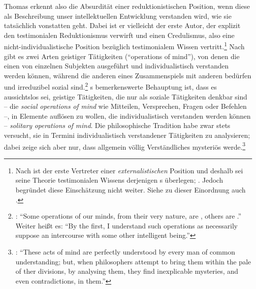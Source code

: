 Thomas  erkennt also die Absurdität einer reduktionistischen
Position, wenn diese als Beschreibung unser intellektuellen Entwicklung
verstanden wird, wie sie tatsächlich vonstatten geht. Dabei
ist er vielleicht der erste Autor, der explizit den testimonialen Reduktionismus
verwirft und einen Credulismus, also eine nicht-individualistische Position
bezüglich testimonialem Wissen vertritt.\footnote{Nach
 ist  der erste Vertreter einer
\emph{externalistischen} Position und deshalb sei seine Theorie testimonialen Wissens derjenigen s
überlegen;
\cite[vgl.][537]{Grundmann:AnalytischeEinfuehrungindieErkenntnistheorie2008}.
Jedoch begründet
 diese
Einschätzung nicht weiter. Siehe zu dieser Einordnung auch
\cite{Woudenberg:ThomasReidbetweenExternalismandInternalism2013}.} Nach
 gibt es zwei Arten
geistiger Tätigkeiten (\enquote{operations of mind}), von denen die einen von
einzelnen Subjekten ausgeführt und individualistisch verstanden werden können,
während die anderen eines Zusammenspiels mit anderen bedürfen und irreduzibel
sozial
sind.\footnote{\cite[Vgl.][68]{Reid:EssaysontheIntellectualPowersofMan2002}:
\enquote{Some operations of our minds, from their very nature, are ,
others are .} Weiter heißt es: \enquote{By the first, I understand
such operations as necessarily suppose an intercourse with some other
intelligent being.}} s
bemerkenswerte Behauptung ist, dass es aussichtslos sei, geistige Tätigkeiten,
die nur als soziale Tätigkeiten denkbar sind -- die \emph{social operations of
mind} wie Mitteilen, Versprechen, Fragen oder Befehlen --, in Elemente auflösen
zu wollen, die individualistisch verstanden werden können -- \emph{solitary
operations of mind}. Die
philosophische Tradition habe zwar stets versucht, sie in Termini
individualistisch verstandener Tätigkeiten zu analysieren; dabei zeige sich aber
nur, dass allgemein völlig Verständliches mysteriös
werde.\footnote{\cite[Vgl.][68]{Reid:EssaysontheIntellectualPowersofMan2002}:
\enquote{These acts of mind are perfectly understood by every man of common
understanding; but, when philosophers attempt to bring them within the pale of
ther divisions, by analysing them, they find inexplicable mysteries, and even
contradictions, in them.}}

